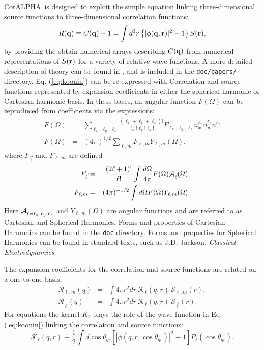 \documentclass[10pt]{article}
\newcommand{\projectname}{CorALPHA}
\begin{document}
\projectname\ is designed to exploit the simple equation linking three-dimensional source functions to three-dimensional correlation functions:
\begin{equation}
\label{eq:koonin}
R({\bf q})\equiv C({\bf q})-1=\int d^3r \left\{|\phi({\bf q},{\bf r})|^2-1\right\} S({\bf r}),
\end{equation}
by providing the obtain numerical arrays describing $C({\bf q})$ from numerical representations of $S({\bf r})$ for a variety of relative wave functions. A more detailed description of theory can be found in \cite{Lisa:2005dd}, and is included in the {\tt doc/papers/} directory. Eq. (\ref{eq:koonin}) can be re-expressed with Correlation and source functions represented by expansion coefficients in either the spherical-harmonic or Cartesian-harmonic basis. In these bases, an angular function $F(\Omega)$ can be  reproduced from coefficients via the expressions:
\begin{eqnarray}
F(\Omega)&=&\sum_{\ell_x,\ell_y,\ell_z} \frac{(\ell_x+\ell_y+\ell_z)!}
{\ell_x!\ell_y!\ell_z!} F_{\ell_x,\ell_y,\ell_z}
n_x^{\ell_x}n_y^{\ell_y}n_z^{\ell_z}\\
F(\Omega)&=&(4\pi)^{1/2}\sum_{\ell,m}F_{\ell,m}Y_{\ell,m}(\Omega),
\end{eqnarray}
where $F_{\vec\ell}$ and $F_{\ell,m}$ are defined
\begin{eqnarray}
F_{\vec{\ell}}&=&\frac{(2\ell+1)!}{\ell !}\int\frac{d\Omega}{4\pi}
F(\Omega){\cal A}_{\vec{\ell}}(\Omega),\\
F_{\ell,m}&=&(4\pi)^{-1/2}\int d\Omega F(\Omega) Y_{\ell,m}(\Omega).
\end{eqnarray}
Here ${\cal A}_{\vec{\ell}=\ell_x,\ell_y,\ell_z}$ and $Y_{\ell,m}(\Omega)$ are angular functions and are referred to as Cartesian and Spherical Harmonics. Forms and properties of Cartesian Harmonics can be found in the {\tt doc} directory. Forms and properties for Spherical Harmonics can be found in standard texts, such as J.D. Jackson, {\it Classical Electrodynamics}. 

The expansion coefficients for the correlation and source functions are related on a one-to-one basis.
\begin{eqnarray}
{\mathcal R}_{\ell,m}(q)&=&\int 4\pi r^2dr~
{\mathcal K}_\ell(q,r)~{\mathcal S}_{\ell,m}(r),\\
{\mathcal R}_{\vec{\ell}}(q)
&=&\int 4\pi r^2dr~{\mathcal K}_\ell(q,r)
~{\mathcal S}_{\vec{\ell}}(r).
\end{eqnarray}
For equations the kernel $K_{\ell}$ plays the role of the wave function in Eq. (\ref{eq:koonin}) linking the correlation and source functions:
\begin{equation}
{\mathcal K}_\ell(q,r)\equiv\frac{1}{2}\int d\cos\theta_{qr} \left[
|\phi(q,r,\cos\theta_{qr})|^2-1\right] P_\ell(\cos\theta_{qr}).
\end{equation}
\end{document}

